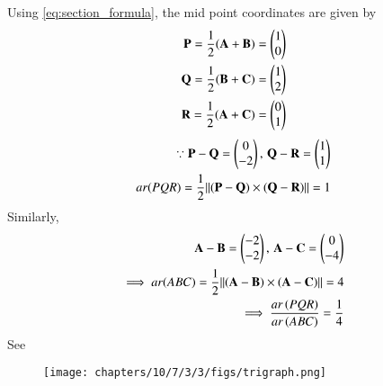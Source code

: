 Using 
	  \eqref{eq:section_formula},
the mid point coordinates are given by
	\begin{align}
		\mathbf{P} = \frac{1}{2}\mathbf(\mathbf{A}+\mathbf{B})  = \begin{pmatrix}1\\0\end{pmatrix}\\
		\mathbf{Q} = \frac{1}{2}\mathbf(\mathbf{B}+\mathbf{C}) = \begin{pmatrix}1\\2\end{pmatrix}\\
		\mathbf{R} = \frac{1}{2}\mathbf(\mathbf{A}+\mathbf{C}) = \begin{pmatrix}0\\1\end{pmatrix}
	\end{align}
	\begin{align}
\because		\mathbf{P}-\mathbf{Q} =  \begin{pmatrix}
 0 \\
 -2 
 \end{pmatrix},\,
		\mathbf{Q}-\mathbf{R} =   \begin{pmatrix}
 1 \\
 1 
 \end{pmatrix}
 \\
		ar(PQR)=\frac{1}{2}{\left\lVert\mathbf(\mathbf{P}-\mathbf{Q})\times\mathbf(\mathbf{Q}-\mathbf{R})\right\rVert}
		=1
	\end{align}
	Similarly, 
	\begin{align}
		\mathbf{A}-\mathbf{B} = \begin{pmatrix}
 -2 \\
 -2 
 \end{pmatrix}
 ,\,
		\mathbf{A}-\mathbf{C} =  \begin{pmatrix}
 0 \\
 -4 
 \end{pmatrix}
 \\
 \implies
		ar(ABC)=\frac{1}{2}{\left\lVert\mathbf(\mathbf{A}-\mathbf{B})\times\mathbf(\mathbf{A}-\mathbf{C})\right\rVert}
=4
\\
		\implies \frac{ar\left(PQR\right)}{ar\left(ABC\right)} = \frac{1}{4}
	\end{align}
	See 
\begin{figure}[H]
	\begin{center} 
	    \texttt{[image: chapters/10/7/3/3/figs/trigraph.png]}
	\end{center}
\caption{}
\label{fig:10/7/3/3Fig}
\end{figure}
